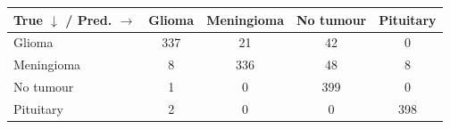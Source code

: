 \begin{tabular}{lcccc}
\toprule
True $\downarrow$ / Pred. $\rightarrow$ & Glioma & Meningioma & No tumour & Pituitary \\
\midrule
Glioma & 337 & 21 & 42 & 0 \\
Meningioma & 8 & 336 & 48 & 8 \\
No tumour & 1 & 0 & 399 & 0 \\
Pituitary & 2 & 0 & 0 & 398 \\
\bottomrule
\end{tabular}